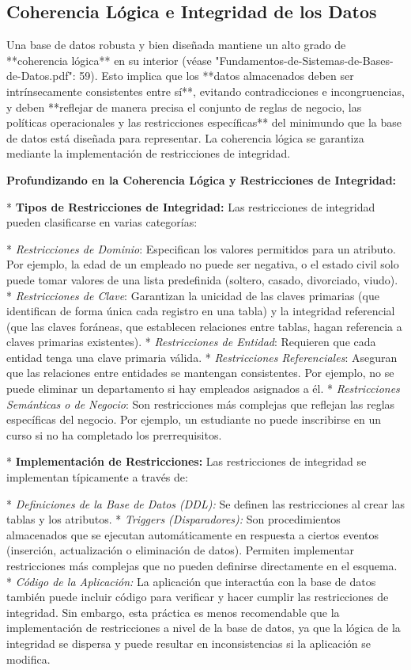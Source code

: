 \subsection{Coherencia Lógica e Integridad de los Datos}

Una base de datos robusta y bien diseñada mantiene un alto grado de **coherencia lógica** en su interior (véase "Fundamentos-de-Sistemas-de-Bases-de-Datos.pdf": 59).  Esto implica que los **datos almacenados deben ser intrínsecamente consistentes entre sí**, evitando contradicciones e incongruencias, y deben **reflejar de manera precisa el conjunto de reglas de negocio, las políticas operacionales y las restricciones específicas** del minimundo que la base de datos está diseñada para representar. La coherencia lógica se garantiza mediante la implementación de restricciones de integridad.

\textbf{Profundizando en la Coherencia Lógica y Restricciones de Integridad:}

*   \textbf{Tipos de Restricciones de Integridad:}  Las restricciones de integridad pueden clasificarse en varias categorías:

    *   \textit{Restricciones de Dominio}: Especifican los valores permitidos para un atributo. Por ejemplo, la edad de un empleado no puede ser negativa, o el estado civil solo puede tomar valores de una lista predefinida (soltero, casado, divorciado, viudo).
    *   \textit{Restricciones de Clave}: Garantizan la unicidad de las claves primarias (que identifican de forma única cada registro en una tabla) y la integridad referencial (que las claves foráneas, que establecen relaciones entre tablas, hagan referencia a claves primarias existentes).
    *   \textit{Restricciones de Entidad}: Requieren que cada entidad tenga una clave primaria válida.
    *   \textit{Restricciones Referenciales}: Aseguran que las relaciones entre entidades se mantengan consistentes. Por ejemplo, no se puede eliminar un departamento si hay empleados asignados a él.
    *   \textit{Restricciones Semánticas o de Negocio}:  Son restricciones más complejas que reflejan las reglas específicas del negocio. Por ejemplo, un estudiante no puede inscribirse en un curso si no ha completado los prerrequisitos.

*   \textbf{Implementación de Restricciones:} Las restricciones de integridad se implementan típicamente a través de:

    *   \textit{Definiciones de la Base de Datos (DDL):}  Se definen las restricciones al crear las tablas y los atributos.
    *   \textit{Triggers (Disparadores):}  Son procedimientos almacenados que se ejecutan automáticamente en respuesta a ciertos eventos (inserción, actualización o eliminación de datos).  Permiten implementar restricciones más complejas que no pueden definirse directamente en el esquema.
    *   \textit{Código de la Aplicación:}  La aplicación que interactúa con la base de datos también puede incluir código para verificar y hacer cumplir las restricciones de integridad.  Sin embargo, esta práctica es menos recomendable que la implementación de restricciones a nivel de la base de datos, ya que la lógica de la integridad se dispersa y puede resultar en inconsistencias si la aplicación se modifica.

